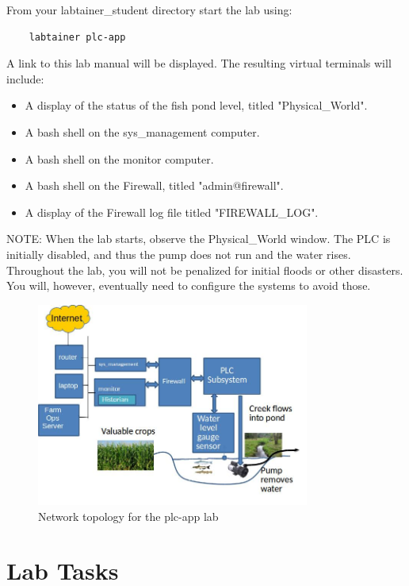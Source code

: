 From your labtainer_student directory start the lab using:
\begin{verbatim}
    labtainer plc-app
\end{verbatim}
\noindent A link to this lab manual will be displayed.  
The resulting virtual terminals will include:
\begin{itemize}
\item A display of the status of the fish pond level, titled "Physical\_World".
\item A bash shell on the sys\_management computer.
\item A bash shell on the monitor computer.
\item A bash shell on the Firewall, titled "admin@firewall".
\item A display of the Firewall log file titled "FIREWALL\_LOG".
\end{itemize}
\noindent NOTE: When the lab starts, observe the Physical\_World window. 
The PLC is initially disabled, and thus the pump does not run and the water rises.
Throughout the lab, you will not be penalized for initial floods or other disasters.
You will, however, eventually need to configure the systems to avoid those.

\begin{figure}[H]
\begin{center}
\includegraphics [width=0.8\textwidth]{plc-app.jpg}
\end{center}
\caption{Network topology for the plc-app lab}
\label{fig:topology}
\end{figure}

\section{Lab Tasks}
